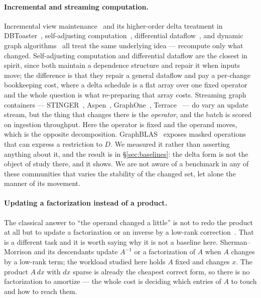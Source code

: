 \documentclass{article}
\begin{document}
\paragraph{Incremental and streaming computation.}
Incremental view maintenance~\citep{gupta1995} and its higher-order delta
treatment in DBToaster~\citep{koch2014}, self-adjusting
computation~\citep{acar2002, acar2005}, differential
dataflow~\citep{mcsherry2013}, and dynamic graph
algorithms~\citep{demetrescu2004} all treat the same underlying idea ---
recompute only what changed. Self-adjusting computation and differential
dataflow are the closest in spirit, since both maintain a dependence structure
and repair it when inputs move; the difference is that they repair a general
dataflow and pay a per-change bookkeeping cost, where a delta schedule is a flat
array over one fixed operator and the whole question is what re-preparing that
array costs. Streaming graph containers --- STINGER~\citep{ediger2012},
Aspen~\citep{dhulipala2019}, GraphOne~\citep{kumar2020},
Terrace~\citep{pandey2021} --- do vary an update stream, but the thing that
changes there is the \emph{operator}, and the batch is scored on ingestion
throughput. Here the operator is fixed and the operand moves, which is the
opposite decomposition. GraphBLAS~\citep{davis2019, buluc2017, graphblas2023}
exposes masked operations that can express a restriction to $D$. We measured
it rather than asserting anything about it, and the result is in
\S\ref{sec:baselines}: the delta form is not the object of study there, and it
shows. We are
not aware of a benchmark in any of these communities that varies the stability
of the changed set, let alone the manner of its movement.

\paragraph{Updating a factorization instead of a product.}
The classical answer to ``the operand changed a little'' is not to redo the
product at all but to update a factorization or an inverse by a low-rank
correction~\citep{sherman1950, hager1989, golub2013}. That is a different task
and it is worth saying why it is not a baseline here. Sherman--Morrison and its
descendants update $A^{-1}$ or a factorization of $A$ when \emph{$A$} changes by
a low-rank term; the workload studied here holds $A$ fixed and changes $x$. The
product $A\,dx$ with $dx$ sparse is already the cheapest correct form, so there
is no factorization to amortize --- the whole cost is deciding which entries of
$A$ to touch and how to reach them.
\end{document}

